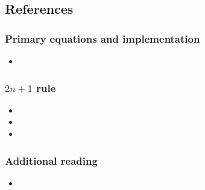 \hypertarget{references}{%
  \subsection{References}\label{references}}

\hypertarget{primary-equations-and-implementation}{%
  \subsubsection{Primary equations and implementation}\label{primary-equations-and-implementation}}

\begin{itemize}
  \tightlist
\item {}
\end{itemize}

\hypertarget{n-1-rule}{%
  \subsubsection{\texorpdfstring{\(2n + 1\) rule}{2n + 1 rule}}\label{n-1-rule}}

\begin{itemize}
  \tightlist
\item {}
\item {}
\item {}
\end{itemize}

\hypertarget{additional-reading}{%
  \subsubsection{Additional reading}\label{additional-reading}}

\begin{itemize}
  \tightlist
  \item {}
\end{itemize}

